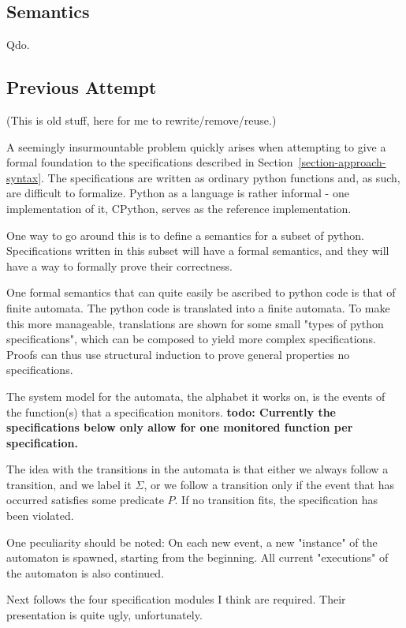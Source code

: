 \documentclass[a4paper,11pt]{kth-mag}
\newcommand{\todo}[1]{\textbf{todo: #1}}
\begin{document}
\subsection{Semantics}

Qdo.


\subsection{Previous Attempt}

(This is old stuff, here for me to rewrite/remove/reuse.)

A seemingly insurmountable problem quickly arises when attempting to give a
formal foundation to the specifications described in
Section~\ref{section-approach-syntax}. The specifications are written as ordinary
python functions and, as such, are difficult to formalize. Python as a language
is rather informal - one implementation of it, CPython, serves as the reference
implementation.

One way to go around this is to define a semantics for a subset of python.
Specifications written in this subset will have a formal semantics, and they
will have a way to formally prove their correctness.

One formal semantics that can quite easily be ascribed to python code is that
of finite automata. The python code is translated into a finite automata. To
make this more manageable, translations are shown for some small "types of
python specifications", which can be composed to yield more complex
specifications. Proofs can thus use structural induction to prove general
properties no specifications.

The system model for the automata, the alphabet it works on, is the events of
the function(s) that a specification monitors. \todo{Currently the
specifications below only allow for one monitored function per specification.}

The idea with the transitions in the automata is that either we always follow a
transition, and we label it $\Sigma$, or we follow a transition only if the
event that has occurred satisfies some predicate $P$. If no transition fits,
the specification has been violated.

One peculiarity should be noted: On each new event, a new "instance" of the
automaton is spawned, starting from the beginning. All current "executions" of
the automaton is also continued.

Next follows the four specification modules I think are required. Their
presentation is quite ugly, unfortunately.
\end{document}
